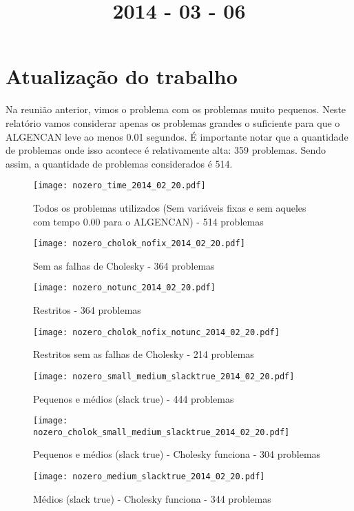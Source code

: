 \documentclass{article}
\title{2014 - 03 - 06}
\author{}
\date{}
\begin{document}
\maketitle
\section{Atualização do trabalho}

Na reunião anterior, vimos o problema com os problemas muito pequenos. Neste
relatório vamos considerar apenas os problemas grandes o suficiente para que o
ALGENCAN leve ao menos 0.01 segundos.
É importante notar que a quantidade de problemas onde isso acontece é
relativamente alta: 359 problemas.
Sendo assim, a quantidade de problemas considerados é 514.

\begin{figure}[H]
  \centering
  \texttt{[image: nozero\_time\_2014\_02\_20.pdf]}
  \caption{Todos os problemas utilizados (Sem variáveis fixas e sem aqueles
  com tempo 0.00 para o ALGENCAN) - 514 problemas}
  \label{fig:nozero_time}
\end{figure}
\begin{figure}[H]
  \centering
  \texttt{[image: nozero\_cholok\_nofix\_2014\_02\_20.pdf]}
  \caption{Sem as falhas de Cholesky - 364 problemas}
\end{figure}
\begin{figure}[H]
  \centering
  \texttt{[image: nozero\_notunc\_2014\_02\_20.pdf]}
  \caption{Restritos - 364 problemas}
\end{figure}
\begin{figure}[H]
  \centering
  \texttt{[image: nozero\_cholok\_nofix\_notunc\_2014\_02\_20.pdf]}
  \caption{Restritos sem as falhas de Cholesky - 214 problemas}
\end{figure}
\begin{figure}[H]
  \centering
  \texttt{[image: nozero\_small\_medium\_slacktrue\_2014\_02\_20.pdf]}
  \caption{Pequenos e médios (slack true) - 444 problemas}
\end{figure}
\begin{figure}[H]
  \centering
  \texttt{[image: nozero\_cholok\_small\_medium\_slacktrue\_2014\_02\_20.pdf]}
  \caption{Pequenos e médios (slack true) - Cholesky funciona - 304 problemas}
\end{figure}
\begin{figure}[H]
  \centering
  \texttt{[image: nozero\_medium\_slacktrue\_2014\_02\_20.pdf]}
  \caption{Médios (slack true) - Cholesky funciona - 344 problemas}
\end{figure}
\end{document}
